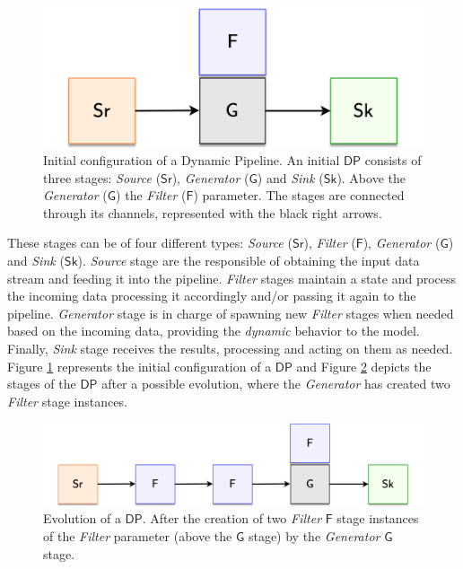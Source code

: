 \begin{figure}[H]
  \centering
  \includegraphics[scale = 0.7]{images/3-Engine/DP-Stages-1.png}
  \caption{Initial configuration of a Dynamic Pipeline. An initial $\mathsf{DP}$ consists of three stages: \emph{Source} ($\mathsf{Sr}$), \emph{Generator} ($\mathsf{G}$) and \emph{Sink} ($\mathsf{Sk}$). Above the  \emph{Generator} ($\mathsf{G}$) the \emph{Filter} ($\mathsf{F}$) parameter. The stages are connected through its channels, represented with the black right arrows.}
  \label{img:DP-Stages-1}
\end{figure}

These stages can be of four different types: \emph{Source} ($\mathsf{Sr}$), \emph{Filter} ($\mathsf{F}$), \emph{Generator} ($\mathsf{G}$) and \emph{Sink} ($\mathsf{Sk}$). \emph{Source} stage are the responsible of obtaining the input data stream and feeding it into the pipeline. \emph{Filter} stages maintain a state and process the incoming data processing it accordingly and/or passing it again to the pipeline. \emph{Generator} stage is in charge of spawning new \emph{Filter} stages when needed based on the incoming data, providing the \textit{dynamic} behavior to the model. Finally, \emph{Sink} stage receives the results, processing and acting on them as needed.
Figure \ref{img:DP-Stages-1} represents the initial configuration of a $\mathsf{DP}$ and Figure \ref{img:DP-Stages-2} depicts the stages of the $\mathsf{DP}$ after a possible evolution, where the \emph{Generator} has created two \emph{Filter} stage instances.\\

\begin{figure}[H]
  \centering
  \includegraphics[scale = 0.7]{images/3-Engine/DP-Stages-2.png}
  \caption{Evolution of a $\mathsf{DP}$. After the creation of two \emph{Filter} $\mathsf{F}$ stage instances of the \emph{Filter} parameter (above the $\mathsf{G}$ stage) by the \emph{Generator} $\mathsf{G}$ stage.}
  \label{img:DP-Stages-2}
\end{figure}


